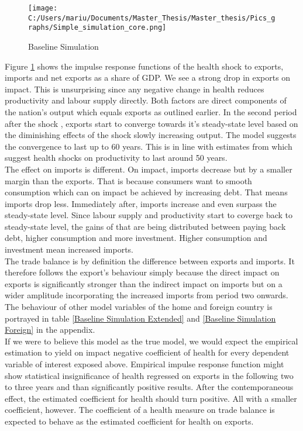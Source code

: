 \documentclass{article}
\begin{document}
\begin{figure}[!ht]
\begin{center}\caption{Baseline Simulation \label{Baseline Simulation}}
\texttt{[image: C:/Users/mariu/Documents/Master\_Thesis/Master\_thesis/Pics\_graphs/Simple\_simulation\_core.png]}\\
\end{center}
\end{figure}

Figure \ref{Baseline Simulation} shows the impulse response functions of the health shock to exports, imports and net exports as a share of GDP. We see a strong drop in exports on impact. This is unsurprising since any negative change in health reduces productivity and labour supply directly. Both factors are direct components of the nation's output which equals exports as outlined earlier. In the second period after the shock , exports start to converge towards it's steady-state level based on the diminishing effects of the shock slowly increasing output. The model suggests the convergence to last up to 60 years. This is in line with estimates from \cite{ashraf2008does} which suggest health shocks on productivity to last around 50 years.\\
The effect on imports is different. On impact, imports decrease but by a smaller margin than the exports. That is because consumers want to smooth consumption which can on impact be achieved by increasing debt. That means imports drop less. Immediately after, imports increase and even surpass the steady-state level. Since labour supply and productivity start to coverge back to steady-state level, the gains of that are being distributed between paying back debt, higher consumption and more investment. Higher consumption and investment mean increased imports.\\
The trade balance is by definition the difference between exports and imports. It therefore follows the export's behaviour simply because the direct impact on exports is significantly stronger than the indirect impact on imports but on a wider amplitude incorporating the increased imports from period two onwards. The behaviour of other model variables of the home and foreign country is portrayed in table \ref{Baseline Simulation Extended} and \ref{Baseline Simulation Foreign} in the appendix. \\
If we were to believe this model as the true model, we would expect the empirical estimation to yield on impact negative coefficient of health for every dependent variable of interest exposed above. Empirical impulse response function might show statistical insignificance of health regressed on exports in the following two to three years and than significantly positive results. After the contemporaneous effect, the estimated coefficient for health should turn positive. All with a smaller coefficient, however. The coefficient of a health measure on trade balance is expected to behave as the estimated coefficient for health on exports.
\end{document}

